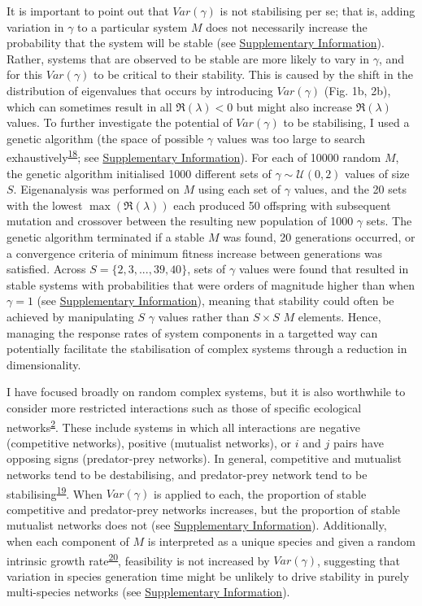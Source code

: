 \documentclass[]{article}
\begin{document}
It is important to point out 
that \(Var(\gamma)\) is not stabilising per se; that is,
adding variation in \(\gamma\) to a particular system \(M\) does not
necessarily increase the probability that the system will be stable (see
\hyperlink{SIstart}{Supplementary Information}). Rather, systems that are 
observed to be stable are more likely to vary in \(\gamma\), and for this
\(Var(\gamma)\) to be critical to their stability. This is caused by the
shift in the distribution of eigenvalues that occurs by introducing
\(Var(\gamma)\) (Fig. 1b, 2b), which can sometimes result in all
\(\Re(\lambda) < 0\) but might also increase \(\Re(\lambda)\) values. To
further investigate the potential of \(Var(\gamma)\) to be stabilising,
I used a genetic algorithm (the space of possible \(\gamma\)
values was too large to search
exhaustively\textsuperscript{\protect\hyperlink{ref-Hamblin2013}{18}};
see \hyperlink{SIstart}{Supplementary Information}). For each of 10000 
random \(M\), the
genetic algorithm initialised 1000 different sets of
\(\gamma \sim \mathcal{U}(0, 2)\) values of size \(S\). Eigenanalysis was
performed on \(M\) using 
each set of \(\gamma\) values, and the 20 sets with the
lowest \(\max\left(\Re(\lambda)\right)\) each produced 50 offspring with
subsequent mutation and crossover between the resulting new population
of 1000 \(\gamma\) sets. The genetic algorithm terminated if a stable
\(M\) was found, 20 generations occurred, or a convergence criteria of
minimum fitness increase between generations was satisfied. Across
\(S = \{2, 3, ..., 39, 40\}\), sets of \(\gamma\) values were found that
resulted in stable systems with probabilities that were orders of
magnitude higher than when \(\gamma = 1\) (see \hyperlink{SIstart}{Supplementary
Information}), meaning that stability could often be achieved by 
manipulating \(S\) \(\gamma\) values rather than \(S \times S\) \(M\) elements.
Hence, managing the response rates of system components in a targetted
way can potentially facilitate the stabilisation of complex systems 
through a reduction in dimensionality.

I have focused broadly on random complex systems, but it is also
worthwhile to consider more restricted interactions such as those of
specific ecological
networks\textsuperscript{\protect\hyperlink{ref-Allesina2012}{2}}. These
include systems in which all interactions are negative (competitive networks), positive (mutualist networks), or \(i\) and
\(j\) pairs have opposing signs (predator-prey networks). In
general, competitive and mutualist networks tend to be destabilising,
and predator-prey network tend to be
stabilising\textsuperscript{\protect\hyperlink{ref-Allesina2011}{19}}.
When \(Var(\gamma)\) is applied to each, the proportion of stable
competitive and predator-prey networks increases, but the proportion of
stable mutualist networks does not (see 
\hyperlink{SIstart}{Supplementary Information}).
Additionally, when each component of \(M\) is interpreted as a unique
species and given a random intrinsic growth
rate\textsuperscript{\protect\hyperlink{ref-Dougoud2018}{20}},
feasibility is not increased by \(Var(\gamma)\), suggesting that
variation in species generation time might be unlikely to drive
stability in purely multi-species networks (see \hyperlink{SIstart}{Supplementary
Information}).
\end{document}
